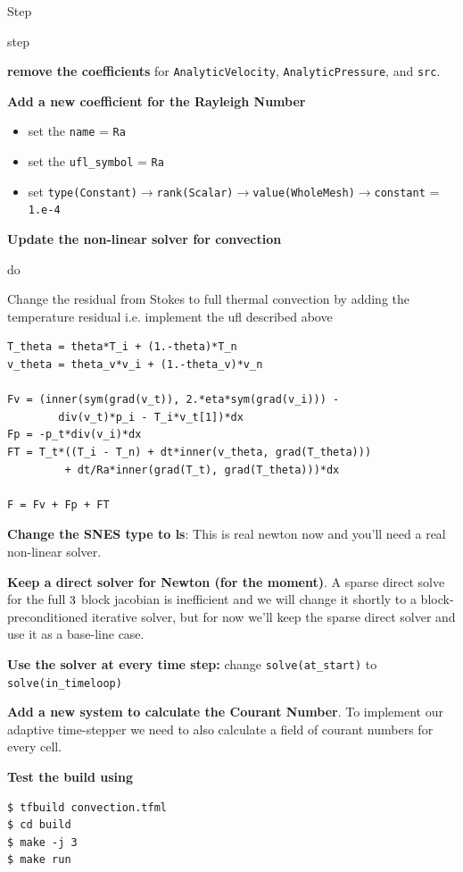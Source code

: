 \begin{steps}{Step}
\begin{steps}{step}
    \item \textbf{remove the coefficients} for \texttt{AnalyticVelocity},
      \texttt{AnalyticPressure}, and \texttt{src}.
    \item \textbf{Add a new coefficient for the Rayleigh Number}
      \begin{itemize}
      \item set the \texttt{name} = \texttt{Ra}
      \item set the \texttt{ufl\_symbol} = \texttt{Ra}
      \item set
        \texttt{type(Constant)}$\rightarrow$\texttt{rank(Scalar)}$\rightarrow$\texttt{value(WholeMesh)}$\rightarrow$\texttt{constant}
        = \texttt{1.e-4}
      \end{itemize}
    \item \textbf{Update the non-linear solver for convection}
    \begin{steps}{do}
    \item Change the residual from Stokes to full   thermal convection
      by adding the temperature residual i.e. implement the ufl
      described above 
    \begin{lstlisting}[style=UFL]
T_theta = theta*T_i + (1.-theta)*T_n
v_theta = theta_v*v_i + (1.-theta_v)*v_n

Fv = (inner(sym(grad(v_t)), 2.*eta*sym(grad(v_i))) - 
        div(v_t)*p_i - T_i*v_t[1])*dx
Fp = -p_t*div(v_i)*dx
FT = T_t*((T_i - T_n) + dt*inner(v_theta, grad(T_theta)))
         + dt/Ra*inner(grad(T_t), grad(T_theta)))*dx

F = Fv + Fp + FT
    \end{lstlisting}
  \item \textbf{Change the SNES type to ls}:  This is real newton now
    and you'll need a real non-linear solver.
  \item \textbf{Keep a direct solver for Newton (for the moment)}.  A
    sparse direct solve for the full $3\time3$ block jacobian is
    inefficient and we will change it shortly to a
    block-preconditioned iterative solver, but for now we'll keep the
    sparse direct solver and use it as a base-line case.
    \end{steps}
  \item \textbf{Use the solver at every time step:} change
    \texttt{solve(at\_start)} to \texttt{solve(in\_timeloop)}
  \item \textbf{Add a new system to calculate the Courant Number}.  To
    implement our adaptive time-stepper we need to also calculate a
    field of courant numbers for every cell.  
   \end{steps}
  \item \textbf{Test the build using}
   \begin{lstlisting}[style=Bash]
$ tfbuild convection.tfml
$ cd build
$ make -j 3
$ make run
   \end{lstlisting}
\end{steps}


